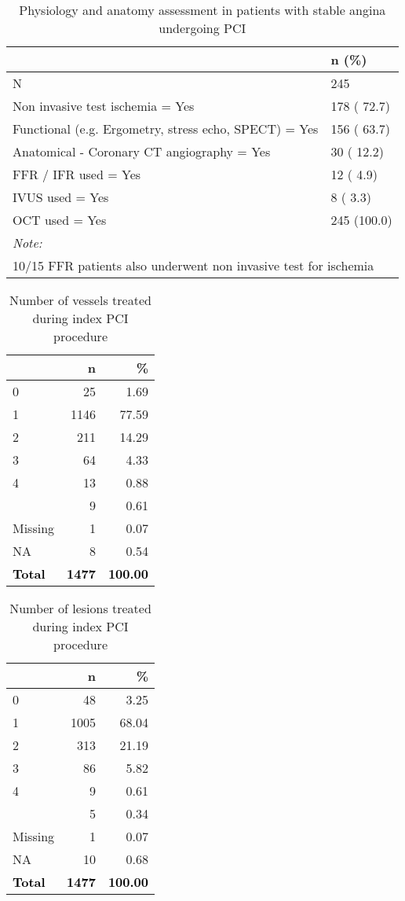 \documentclass[
]{article}
\begin{document}
\begin{longtable}[t]{ll}
\caption{\label{tab:table 27}Physiology and anatomy assessment in patients with stable angina undergoing PCI}\\
\toprule
 & n (\%)\\
\midrule
N & 245\\
Non invasive test ischemia = Yes & 178 ( 72.7)\\
\hspace{1em}Functional (e.g. Ergometry, stress echo, SPECT) = Yes & 156 ( 63.7)\\
\hspace{1em}Anatomical - Coronary CT angiography = Yes & 30 ( 12.2)\\
FFR / IFR used  = Yes & 12 (  4.9)\\
\addlinespace
IVUS used = Yes & 8 (  3.3)\\
OCT used = Yes & 245 (100.0)\\
\bottomrule
\multicolumn{2}{l}{\rule{0pt}{1em}\textit{Note: }}\\
\multicolumn{2}{l}{\rule{0pt}{1em}10/15 FFR patients also underwent non invasive test for ischemia}\\
\end{longtable}

\begin{longtable}[t]{lrr}
\caption{\label{tab:table 28}Number of vessels treated during index PCI procedure}\\
\toprule
 & n & \%\\
\midrule
0 & 25 & 1.69\\
1 & 1146 & 77.59\\
2 & 211 & 14.29\\
3 & 64 & 4.33\\
4 & 13 & 0.88\\
\addlinespace
5 & 9 & 0.61\\
Missing & 1 & 0.07\\
NA & 8 & 0.54\\
\textcolor{black}{\textbf{Total}} & \textcolor{black}{\textbf{1477}} & \textcolor{black}{\textbf{100.00}}\\
\bottomrule
\end{longtable}

\begin{longtable}[t]{lrr}
\caption{\label{tab:table 29}Number of lesions treated during index PCI procedure}\\
\toprule
 & n & \%\\
\midrule
0 & 48 & 3.25\\
1 & 1005 & 68.04\\
2 & 313 & 21.19\\
3 & 86 & 5.82\\
4 & 9 & 0.61\\
\addlinespace
5 & 5 & 0.34\\
Missing & 1 & 0.07\\
NA & 10 & 0.68\\
\textcolor{black}{\textbf{Total}} & \textcolor{black}{\textbf{1477}} & \textcolor{black}{\textbf{100.00}}\\
\bottomrule
\end{longtable}
\end{document}
